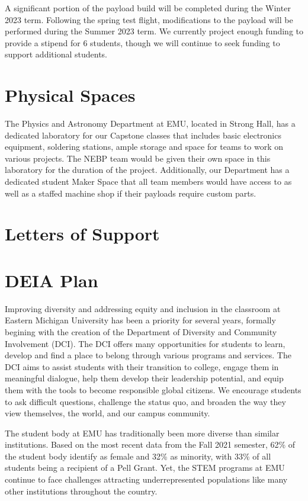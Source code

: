 \documentclass[12pt]{article}
\begin{document}
A significant portion of the payload build will be completed during the Winter 2023
term. Following the spring test flight, modifications to the payload will be
performed during the Summer 2023 term. We currently project enough funding to
provide a stipend for 6 students, though we will continue to seek funding to support
additional students.




\section{Physical Spaces}
The Physics and Astronomy Department at EMU, located in Strong Hall, has a dedicated
laboratory for our Capstone classes that includes basic electronics equipment,
soldering stations, ample storage and space for teams to work on various projects.
 The NEBP team would be given their own space in this laboratory for the duration of
 the project. Additionally, our Department has a dedicated student Maker Space that all
  team members would have access to as well as a staffed machine shop if their payloads
  require custom parts.


\section{Letters of Support}



\section{DEIA Plan}

Improving diversity and addressing equity and inclusion in the classroom
at Eastern Michigan University has been a priority for several years, formally 
begining with the creation of the Department of Diversity and Community 
Involvement (DCI). The DCI offers many opportunities for students to learn, 
develop and find a place to belong through various programs and services. 
The DCI aims to assist students with their transition to college, 
engage them in meaningful dialogue, help them develop their leadership potential, 
and equip them with the tools to become responsible global citizens. 
We encourage students to ask difficult questions, challenge the status quo,
 and broaden the way they view themselves, the world, and our campus community. 
 
The student
body at EMU has traditionally been more diverse than similar institutions. Based
on the most recent data from the Fall 2021 semester, 62\% of the student body
identify as female and 32\% as minority, with 33\% of all students being a
recipient of a Pell Grant. Yet, the STEM
programs at EMU
continue to face challenges attracting underrepresented populations like many other
institutions throughout the country.
\end{document}
